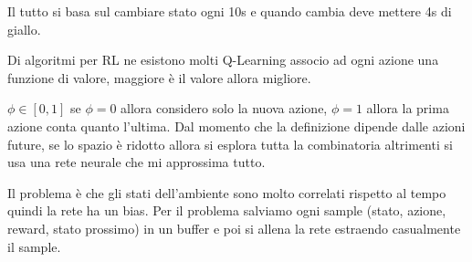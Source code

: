 Il tutto si basa sul cambiare stato ogni 10s e quando cambia deve mettere 4s di 
giallo.

Di algoritmi per RL ne esistono molti Q-Learning associo ad ogni azione 
una funzione di valore, maggiore è il valore allora migliore.

$\phi \in [0,1]$ se $\phi=0$ allora considero solo la nuova azione, $\phi=1$ 
allora la prima azione conta quanto l'ultima. Dal momento che la definizione dipende 
dalle azioni future, se lo spazio è ridotto allora si esplora tutta la combinatoria 
altrimenti si usa una rete neurale che mi approssima tutto.

Il problema è che gli stati dell'ambiente sono molto correlati rispetto al tempo 
quindi la rete ha un bias. Per il problema salviamo ogni sample (stato, azione, 
reward, stato prossimo) in un buffer e poi si allena la rete estraendo casualmente 
il sample.